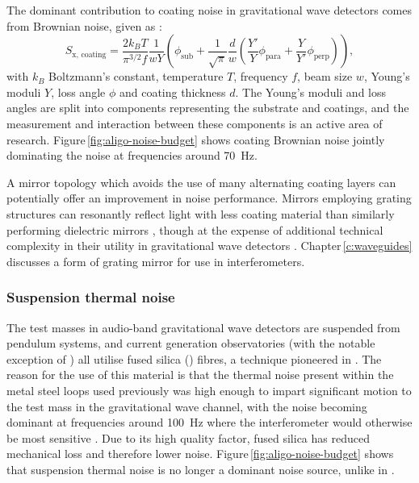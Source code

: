 The dominant contribution to coating noise in gravitational wave detectors comes from Brownian noise, given as \cite{Harry2002}:
\begin{equation}
  S_{\text{x, coating}} = \frac{2 k_B T}{\pi^{3/2} f} \frac{1}{w Y} \left( \phi_{\text{sub}} + \frac{1}{\sqrt{\pi}} \frac{d}{w} \left( \frac{Y'}{Y} \phi_{\text{para}} + \frac{Y}{Y'} \phi_{\text{perp}} \right) \right),
\end{equation}
with $k_B$ Boltzmann's constant, temperature $T$, frequency $f$, beam size $w$, Young's moduli $Y$, loss angle $\phi$ and coating thickness $d$. The Young's moduli and loss angles are split into components representing the substrate and coatings, and the measurement and interaction between these components is an active area of research. Figure\,\ref{fig:aligo-noise-budget} shows coating Brownian noise jointly dominating the noise at frequencies around \SI{70}{\hertz}.

A mirror topology which avoids the use of many alternating coating layers can potentially offer an improvement in noise performance. Mirrors employing grating structures can resonantly reflect light with less coating material than similarly performing dielectric mirrors \cite{Mashev1985}, though at the expense of additional technical complexity in their utility in gravitational wave detectors \cite{Leavey2015}. Chapter\,\ref{c:waveguides} discusses a form of grating mirror for use in interferometers.

\subsubsection{\label{sec:sus-thermal-noise}Suspension thermal noise}
The test masses in audio-band gravitational wave detectors are suspended from pendulum systems, and current generation observatories (with the notable exception of \KAGRA{}) all utilise fused silica () fibres, a technique pioneered in \GEO{}. The reason for the use of this material is that the thermal noise present within the metal steel loops used previously was high enough to impart significant motion to the test mass in the gravitational wave channel, with the noise becoming dominant at frequencies around \SI{100}{\hertz} where the interferometer would otherwise be most sensitive \cite{Hammond2012}. Due to its high quality factor, fused silica has reduced mechanical loss and therefore lower noise. Figure\,\ref{fig:aligo-noise-budget} shows that suspension thermal noise is no longer a dominant noise source, unlike in \ILIGO{}.

